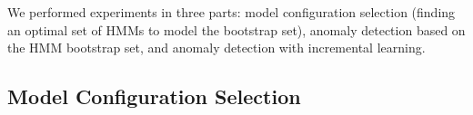 \DIFdelbegin %
\DIFdel{\hspace{0.05in}
  }%
\DIFdel{\hspace{0.05in}
  }%
\DIFdel{\hspace{0.05in}
  }%
{%
}
\DIFdelend %

We performed experiments in three parts: model configuration selection
(finding an optimal set of HMMs to model the bootstrap set), anomaly
detection based on the HMM bootstrap set, and anomaly detection with
incremental learning.

\subsection{Model Configuration Selection}
\label{incremental-model-selection}

